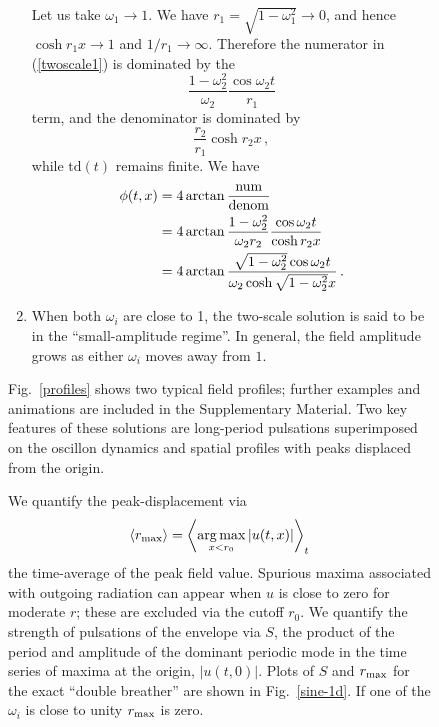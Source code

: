 \documentclass[%
reprint,
superscriptaddress,
amsmath,amssymb,
aps,
prd,
floatfix,
nofootinbib
]{revtex4-1}
\DeclareMathOperator*{\argmax}{arg\,max}
\begin{document}
\begin{figure}
\begin{enumerate}
  Let us take $\omega_1\to1$. We have $r_1=\sqrt{1-\omega_1^2}\to0$, and hence $\cosh r_1 x\to1$ and $1/r_1 \to \infty$. Therefore the numerator in (\ref{twoscale1}) is dominated by the
  \begin{equation}
    \frac{1-\omega^2_2}{\omega_2}\frac{\cos\omega_2 t}{r_1}
  \end{equation}
  term, and the denominator is dominated by
  \begin{equation}
    \frac{r_2}{r_1}\cosh r_2 x\,,
  \end{equation}
  while $\mathrm{td}(t)$ remains finite. We have
  \begin{equation}\label{onescalep1}
    \begin{aligned}
      \phi(t,x) &= 4\arctan \frac{\rm num}{\rm denom}\\ &= 4\arctan \frac{1-\omega^2_2}{\omega_2 r_2}\frac{\cos\omega_2 t}{\cosh r_2 x}\\
      &=4\arctan \frac{\sqrt{1-\omega_2^2}\cos\omega_2 t}{\omega_2 \cosh \sqrt{1-\omega_2^2} x}\,.
    \end{aligned}
  \end{equation}

\item When both $\omega_i$ are close to 1, the two-scale solution is said to be in the ``small-amplitude regime''. In general, the field amplitude grows as either $\omega_i$ moves away from $1$.
\end{enumerate}

Fig.~\ref{profiles} shows two typical field profiles; further examples and animations are included in the Supplementary Material. Two key features of these solutions are long-period pulsations superimposed on the oscillon dynamics and spatial profiles with peaks displaced from the origin.    

We quantify the peak-displacement via
%
\begin{equation}
  \langle r_{\rm max} \rangle  = \left\langle \argmax_{x < r_0} |u(t,x)| \right\rangle_t
\end{equation}
%
the time-average of the peak field value. Spurious maxima associated with outgoing radiation can appear when $u$ is close to zero for moderate $r$; these are excluded via the cutoff  $r_0$. We quantify the strength of pulsations of the envelope via $S$, the product of the period and amplitude of the dominant periodic mode in the time series of maxima at the origin, $|u(t,0)|$.  Plots of $S$ and $r_{\rm max}$ for the exact ``double breather'' are shown in Fig.~\ref{sine-1d}. If one of the $\omega_i$ is close to unity $r_{\rm max}$ is zero. 


\end{figure}
\end{document}
